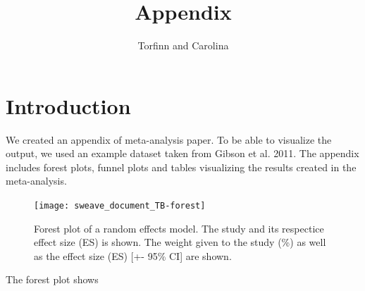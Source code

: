 \documentclass[11pt, a4paper]{article} %
\begin{document}



\title{Appendix}

\author{Torfinn and Carolina}

\maketitle



\section{Introduction}%

We created an appendix of meta-analysis paper. To be able to visualize the output, we used an example dataset taken from Gibson et al. 2011.
The appendix includes forest plots, funnel plots and tables visualizing the results created in the meta-analysis.
\bigskip








\begin{figure}
\captionsetup{width=0.6\textwidth}
\centering
\texttt{[image: sweave\_document\_TB-forest]}
\caption{Forest plot of a random effects model. The study and its respectice effect size (ES) is shown. The weight given to the study (\%) as well as the effect size (ES) [+- 95\% CI] are shown.}
\label{fig:forestplot}
\end{figure}

The forest plot shows 

\end{document}
